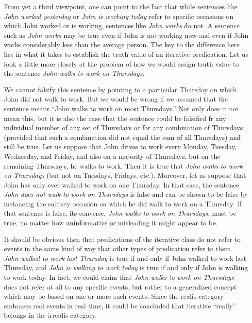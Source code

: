 From yet a third viewpoint, one can point to the fact that while sentences like \textit{John worked yesterday} or \textit{John is working today} refer to specific occasions on which John worked or is working, sentences like \textit{John works} do not. A sentence such as \textit{John works} may be true even if John is not working now and even if John works considerably less than the average person. The key to the difference here lies in what it takes to establish the truth value of an iterative predication. Let us look a little more closely at the problem of how we would assign truth value to the sentence \textit{John walks to work on Thursdays}. 

We cannot falsify this sentence by pointing to a particular Thursday on which John did not walk to work. But we would be wrong if we assumed that the sentence means ``John walks to work on most Thursdays.'' Not only does it not mean this, but it is also the case that the sentence could be falsified fr any individual member of any set of Thursdays or for any combination of Thursdays (provided that such a combination did not equal the sum of all Thursdays) and still be true. Let us suppose that John drives to work every Monday, Tuesday, Wednesday, and Friday, and also on a majority of Thursdays, but on the remaining Thursdays, he walks to work. Then it is true that \textit{John walks to work on Thursdays} (but not on Tuesdays, Fridays, etc.). Moreover, let us suppose that John has only ever walked to work on one Thursday. In that case, the sentence \textit{John does not walk to work on Thursdays} is false and can be shown to be false by instancing the solitary occasion on which he did walk to work on a Thursday. If that sentence is false, its converse, \textit{John walks to work on Thursdays}, must be true, no matter how uninformative or misleading it might appear to be. 

It should be obvious then that predications of the iterative class do not refer to events in the same kind of way that other types of predication refer to them. \textit{John walked to work last Thursday} is true if and only if John walked to work last Thursday, and \textit{John is walking to work today} is true if and only if John is walking to work today. In fact, we could claim that \textit{John walks to work on Thursdays} does not refer at all to any specific events, but rather to a generalized concept which may be based on one or more such events. Since the realis category embraces real events in real time, it could be concluded that iterative ``really'' belongs in the irrealis category.

